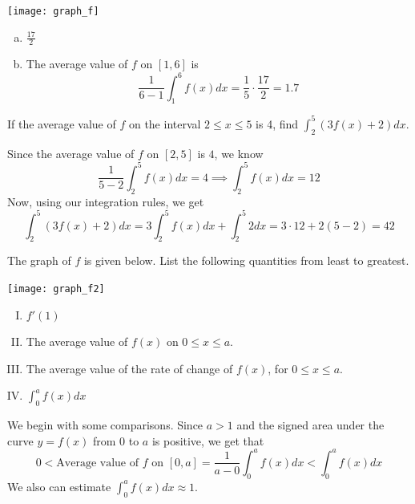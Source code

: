 \documentclass[11pt]{exam}
\begin{document}
\begin{questions}
\begin{multicols}{2}
      \columnbreak
      \texttt{[image: graph\_f]}
    \end{multicols}
    \begin{solution}
      \begin{enumerate}[(a)]
      \item \(\frac{17}{2}\)
      \item The average value of \(f\) on \([1,6]\) is \[
\frac{1}{6-1} \int_1^6 f(x) dx = \frac{1}{5} \cdot \frac{17}{2} = 1.7
        \]
      \end{enumerate}
    \end{solution}
  \question If the average value of $f$ on the interval $2\leq x \leq 5$ is 4, find $\int_2^5(3f(x) + 2) dx$.
    \begin{solution}
      Since the average value of \(f\) on \([2,5]\) is \(4\), we
      know \[
        \frac{1}{5-2} \int_2^5 f(x) dx = 4 \implies \int_2^5 f(x) dx = 12
      \]
      Now, using our integration rules, we get \[
        \int_2^5 (3f(x)+2) dx = 3 \int_2^5 f(x) dx + \int_2^5 2 dx = 3
        \cdot 12 + 2(5-2) = 42
      \]
    \end{solution}
  \question The graph of \(f\) is given below. List the following
    quantities from least to greatest.
    \begin{minipage}{0.5\linewidth}
      \texttt{[image: graph\_f2]}
    \end{minipage}
    \begin{minipage}{0.5\linewidth}
      \begin{enumerate}[(I)]
      \item \(f'(1)\)
      \item The average value of \(f(x)\) on \(0 \leq x \leq a\).
      \item The average value of the rate of change of \(f(x)\), for
        \(0 \leq x \leq a\).
      \item \(\int_0^a f(x) dx\)
      \end{enumerate}
    \end{minipage}
    \begin{solution}
      We begin with some comparisons. Since \(a > 1\) and the signed
      area under the curve \(y=f(x)\) from \(0\) to \(a\) is positive, we get that \[
        0 < \text{Average value of }f\text{ on }[0,a] = \frac{1}{a-0}
       \int_0^a f(x) dx < \int_0^a f(x) dx
      \]
      We also can estimate \(\int_0^a f(x) dx \approx 1\).


\end{solution}
\end{questions}
\end{document}
